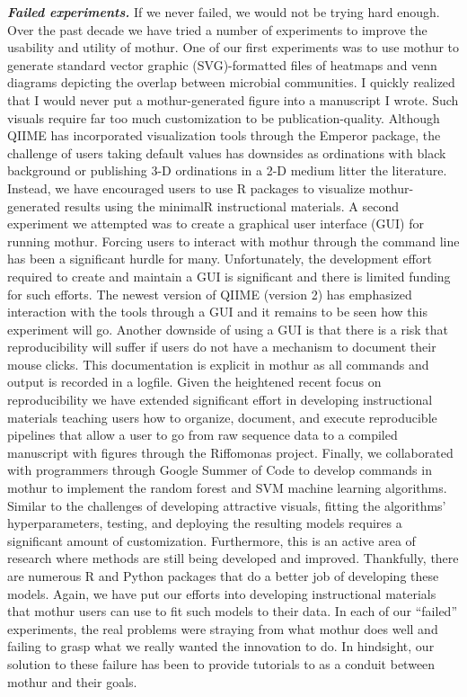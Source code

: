\documentclass[11pt,]{article}
\begin{document}
\textbf{\emph{Failed experiments.}} If we never failed, we would not be
trying hard enough. Over the past decade we have tried a number of
experiments to improve the usability and utility of mothur. One of our
first experiments was to use mothur to generate standard vector graphic
(SVG)-formatted files of heatmaps and venn diagrams depicting the
overlap between microbial communities. I quickly realized that I would
never put a mothur-generated figure into a manuscript I wrote. Such
visuals require far too much customization to be publication-quality.
Although QIIME has incorporated visualization tools through the Emperor
package, the challenge of users taking default values has downsides as
ordinations with black background or publishing 3-D ordinations in a 2-D
medium litter the literature. Instead, we have encouraged users to use R
packages to visualize mothur-generated results using the minimalR
instructional materials. A second experiment we attempted was to create
a graphical user interface (GUI) for running mothur. Forcing users to
interact with mothur through the command line has been a significant
hurdle for many. Unfortunately, the development effort required to
create and maintain a GUI is significant and there is limited funding
for such efforts. The newest version of QIIME (version 2) has emphasized
interaction with the tools through a GUI and it remains to be seen how
this experiment will go. Another downside of using a GUI is that there
is a risk that reproducibility will suffer if users do not have a
mechanism to document their mouse clicks. This documentation is explicit
in mothur as all commands and output is recorded in a logfile. Given the
heightened recent focus on reproducibility we have extended significant
effort in developing instructional materials teaching users how to
organize, document, and execute reproducible pipelines that allow a user
to go from raw sequence data to a compiled manuscript with figures
through the Riffomonas project. Finally, we collaborated with
programmers through Google Summer of Code to develop commands in mothur
to implement the random forest and SVM machine learning algorithms.
Similar to the challenges of developing attractive visuals, fitting the
algorithms' hyperparameters, testing, and deploying the resulting models
requires a significant amount of customization. Furthermore, this is an
active area of research where methods are still being developed and
improved. Thankfully, there are numerous R and Python packages that do a
better job of developing these models. Again, we have put our efforts
into developing instructional materials that mothur users can use to fit
such models to their data. In each of our ``failed'' experiments, the
real problems were straying from what mothur does well and failing to
grasp what we really wanted the innovation to do. In hindsight, our
solution to these failure has been to provide tutorials to as a conduit
between mothur and their goals.
\end{document}
